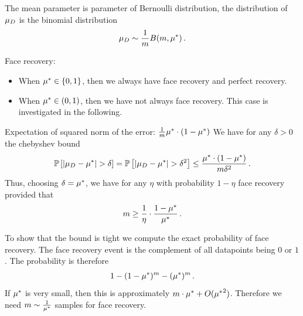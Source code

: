 \begin{example}

    The mean parameter is parameter of Bernoulli distribution, the distribution of $\mu_{D}$ is the binomial distribution
    \begin{align*}
        \mu_{D} \sim \frac{1}{m} B(m,\mu^*)  \, .
    \end{align*}

    Face recovery:
    \begin{itemize}
        \item When $\mu^*\in\{0,1\}$, then we always have face recovery and perfect recovery.
        \item When $\mu^*\in(0,1)$, then we have not always face recovery. This case is investigated in the following.
    \end{itemize}

    Expectation of squared norm of the error: $\frac{1}{m} \mu^* \cdot (1-\mu^*)$
    We have for any $\delta>0$ the chebyshev bound
    \begin{align*}
        \probat{\absof{\datamean-\genmean}>\delta}
        = \probat{\absof{\datamean-\genmean}>\delta^2}
        \leq \frac{\genmean \cdot (1-\genmean)}{\datdim \delta^2} \, .
    \end{align*}
    Thus, choosing $\delta=\mu^*$, we have for any $\eta$ with probability $1-\eta$ face recovery provided that
    \begin{align*}
        m \geq
        \frac{1}{\eta} \cdot \frac{1-\mu^*}{\mu^*} \, .
    \end{align*}

    To show that the bound is tight we compute the exact probability of face recovery.
    The face recovery event is the complement of all datapoints being $0$ or $1$.
    The probability is therefore
    \begin{align*}
        1- (1-\mu^*)^{m} - (\mu^*)^{m} \, .
    \end{align*}
    If $\mu^*$ is very small, then this is approximately $m\cdot \mu^* + O({\mu^*}^{2})$.
    Therefore we need $m\sim\frac{1}{\mu^*}$ samples for face recovery.



\end{example}